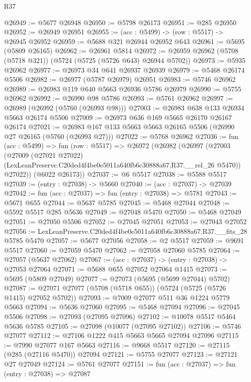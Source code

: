 \begin{lexlean}{R37}
\begin{coremodule}
@26949 := @5677 @26948
@26950 := @5798 @26173
@26951 := @285 @26950
@26952 := @26949 @26951
@26955 := (acc : @5499) -> (row : @5517) -> @26945 @26952
@26959 := @5688 @321 @26944 @26952 @643
@26961 := @5695 (@5809 @26165)
@26962 := @26961 @5814
@26972 := @26959 @26962 (@5708 (@5718 @321)) (@5724 (@5725 (@5726 @643) @26944 @5702))
@26973 := @5935 @26962
@26977 := @26973 @34 @641 @26937 @26939
@26979 := @5468 @26174 @5506
@26982 := @26977 (@5787 @26979) @26951
@26983 := @5746 @26962
@26989 := @26983 @119 @640 @5663 @26936 @5786 @26979
@26990 := @5755 @26962
@26992 := @26990 @98 @5786
@26993 := @5761 @26962
@26997 := @26989 (@26992 (@5760 (@26993 @98)))
@27003 := @26983 @638 @133 @26934 @5663 @26174 @5506
@27009 := @26973 @636 @169 @5665 @26170 @26167 @26174
@27021 := @26983 @167 @133 @5663 @5663 @26165 @5506 (@26990 @27 @26165 (@5760 (@26993 @27)))
@27022 := @5768 @26962
@27036 := fun (acc : @5499) =>
  fun (row : @5517) =>
  @26972
    (@26982
      (@26997
        (@27003
          (@27009
            (@27021 @27022)
            (LexLeanPreserve.C20ded4f4be0e5011a640fb6c30888a67.R37.__rel_26 @5470))
          @27022))
      (@6022 @26173))
@27037 := @6 @5517
@27038 := @5588 @5517
@27039 := (entry : @27038) -> @5660
@27040 := (acc : @27037) -> @27039
@27042 := fun (acc : @27037) => fun (entry : @27038) => @5781
@27043 := @5671 @655
@27044 := @5637 @5785
@27045 := @5468 @27044
@27048 := @5592 @5517 @285 @5636
@27049 := @27048 @5470
@27050 := @5468 @27049
@27051 := @27050 @5506
@27052 := @27045 @27051
@27053 := @27043 @27052
@27056 := LexLeanPreserve.C20ded4f4be0e5011a640fb6c30888a67.R37.__fits_28 @5785 @5470
@27057 := @5677 @27056
@27058 := @2 @5517
@27059 := @9691 @5517
@27060 := @27059 @5470
@27062 := @27058 @27060 @5785
@27064 := @27057 (@5637 @27062)
@27067 := (acc : @27037) -> (entry : @27038) -> @27053 @27064
@27071 := @5688 @655 @27052 @27064 @1415
@27073 := @5695 (@5809 @27049)
@27077 := @27073 (@5695 (@5699 @27044) @5702)
@27087 := @27071 @27077 (@5708 (@5718 @655)) (@5724 (@5725 (@5726 @1415) @27052 @5702))
@27093 := @7009 @27077 @511 @36 @1224 @5779 @5663
@27094 := @5636 @27060
@27095 := @5468 @27094
@27096 := @27045 @5506
@27098 := @27093 (@27095 @27096)
@27102 := @10078 @5517 @5464 @5636 @5785
@27105 := @27098 (@10077 (@27095 @27102))
@27106 := @5746 @27077
@27112 := @27106 @1222 @415 @5663 @5665 @27094 @27096
@27115 := @7990 @27077 @167 @5663
@27116 := @9668 @5517
@27120 := @27115 (@285 (@27116 @5470)) @27094
@27121 := @5755 @27077
@27123 := @27121 @27 @27049
@27124 := @5761 @27077
@27151 := fun (acc : @27037) =>
  fun (entry : @27038) =>
  @27087

\end{coremodule}
\end{lexlean}
